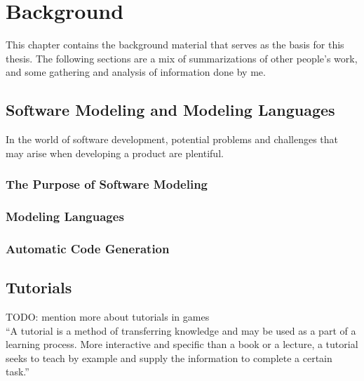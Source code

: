 \chapter{Background}
\label{ch:background}
This chapter contains the background material that serves as the basis for this thesis. The following sections are a mix of summarizations of other people's work, and some gathering and analysis of information done by me.


\section{Software Modeling and Modeling Languages}
\label{sec:software_modeling}
In the world of software development, potential problems and challenges that may arise when developing a product are plentiful.


\subsection{The Purpose of Software Modeling}


\subsection{Modeling Languages}


\subsection{Automatic Code Generation}


\section{Tutorials}
\label{sec:tutorials}
TODO: mention more about tutorials in games \\
``A tutorial is a method of transferring knowledge and may be used as a part of a learning process. More interactive and specific than a book or a lecture, a tutorial seeks to teach by example and supply the information to complete a certain task.''~\cite{wiki:tutorial}


